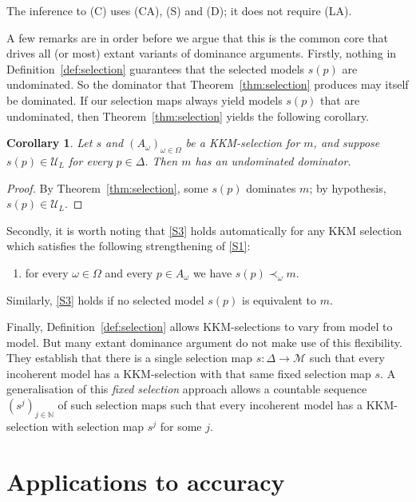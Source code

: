 \documentclass[11pt]{article}
\newcommand{\chg}[1]{{\color{red}#1}}
\newtheorem{corollary}[theorem]{Corollary}
\theoremstyle{definition}
\theoremstyle{remark}
\newcommand{\M}{\mathcal M}
\newcommand{\U}{\mathcal U}
\begin{document}
\chg{The inference to (C) uses (CA), (S) and (D); it does not require (LA).}




A few remarks are in order before we argue that this is the common core that drives all (or most) extant variants of dominance arguments. Firstly, nothing in Definition~\ref{def:selection} guarantees that the selected models $s(p)$ are undominated. So the dominator that Theorem~\ref{thm:selection} produces may itself be dominated. If our selection maps always yield models $s(p)$ that are undominated, then Theorem~\ref{thm:selection} yields the following corollary.



\begin{corollary}\label{cor:undominated-dominators}
Let $s$ and $(A_\omega)_{\omega\in\Omega}$ be a KKM-selection for $m$, and suppose $s(p)\in\U_L$ for every $p\in\Delta$. Then $m$ has an undominated dominator.
\end{corollary}
\begin{proof}
\chg{By Theorem~\ref{thm:selection}, some $s(p)$ dominates $m$; by hypothesis, $s(p)\in\U_L$.}
\end{proof}

Secondly, it is worth noting that \ref{S3} holds automatically for any KKM selection which satisfies the following strengthening of \ref{S1}:
\begin{enumerate}[label=(S\arabic*$^\prime$),leftmargin=3em]
\item\label{S1'} for every $\omega\in\Omega$ and every $p\in A_\omega$ we have $s(p)\prec_\omega m$.
\end{enumerate}
\noindent Similarly, \ref{S3} holds if no selected model $s(p)$ is equivalent to $m$.


Finally, \chg{Definition~\ref{def:selection}} allows KKM-selections to vary from model to model. But many extant dominance argument do not make use of this flexibility. They establish that there is a single selection map $s:\Delta\to\M$ such that every incoherent model has a KKM-selection with that same fixed selection map $s$. A generalisation of this \emph{fixed selection} approach allows a countable sequence $(s^j)_{j\in\mathbb N}$ of such selection maps such that every incoherent model has a KKM-selection with selection map $s^j$ for some $j$.









\section{Applications to accuracy}\label{sec:applications}
\end{document}
